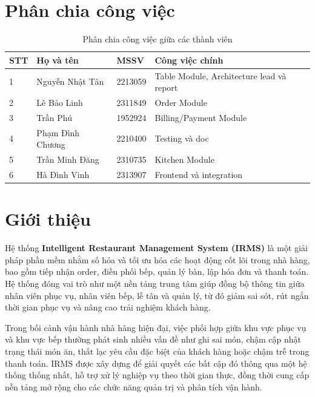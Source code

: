 \documentclass[12pt,a4paper]{article}
\begin{document}
\tableofcontents
\newpage

\section{Phân chia công việc}

\begin{table}[H]
\centering
\caption{Phân chia công việc giữa các thành viên}
\begin{tabular}{|p{0.8cm}|p{4.2cm}|p{2.2cm}|p{6.3cm}|}
\hline
\textbf{STT} & \textbf{Họ và tên} & \textbf{MSSV} & \textbf{Công việc chính} \\
\hline
1 & Nguyễn Nhật Tân & 2213059 & Table Module, Architecture lead và report\\
\hline
2 & Lê Bảo Linh & 2311849 & Order Module \\
\hline
3 & Trần Phú & 1952924 & Billing/Payment Module \\
\hline
4 & Phạm Đình Chương & 2210400 & Testing và doc\\
\hline
5 & Trần Minh Đăng & 2310735 & Kitchen Module \\
\hline
6 & Hà Đình Vinh & 2313907 & Frontend và integration\\
\hline
\end{tabular}
\end{table}

\section{Giới thiệu}

Hệ thống \textbf{Intelligent Restaurant Management System (IRMS)} là một giải pháp phần mềm nhằm số hóa và tối ưu hóa các hoạt động cốt lõi trong nhà hàng, bao gồm tiếp nhận order, điều phối bếp, quản lý bàn, lập hóa đơn và thanh toán. Hệ thống đóng vai trò như một nền tảng trung tâm giúp đồng bộ thông tin giữa nhân viên phục vụ, nhân viên bếp, lễ tân và quản lý, từ đó giảm sai sót, rút ngắn thời gian phục vụ và nâng cao trải nghiệm khách hàng.

Trong bối cảnh vận hành nhà hàng hiện đại, việc phối hợp giữa khu vực phục vụ và khu vực bếp thường phát sinh nhiều vấn đề như ghi sai món, chậm cập nhật trạng thái món ăn, thất lạc yêu cầu đặc biệt của khách hàng hoặc chậm trễ trong thanh toán. IRMS được xây dựng để giải quyết các bất cập đó thông qua một hệ thống thống nhất, hỗ trợ xử lý nghiệp vụ theo thời gian thực, đồng thời cung cấp nền tảng mở rộng cho các chức năng quản trị và phân tích vận hành.
\end{document}
